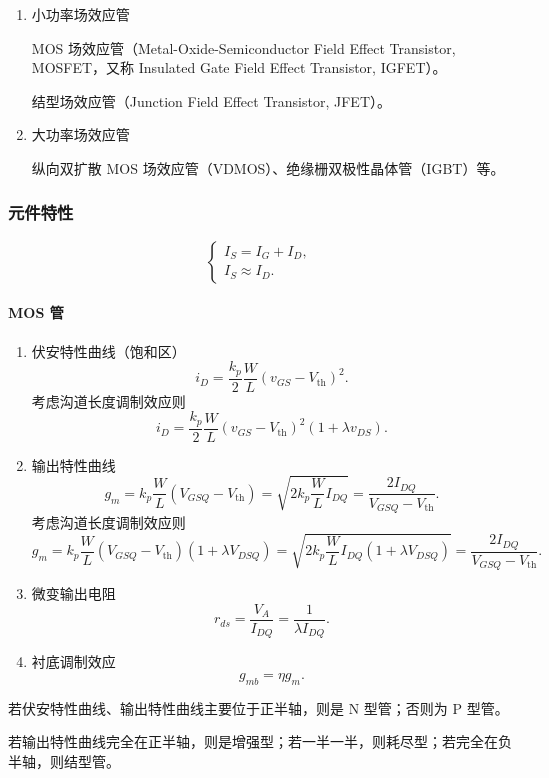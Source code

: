 \documentclass[UTF8,fontset=fandol,zihao=5]{ctexart}
\begin{document}
\begin{enumerate}
  \item 小功率场效应管

  MOS 场效应管（Metal-Oxide-Semiconductor Field Effect Transistor, MOSFET，又称 Insulated Gate Field Effect Transistor, IGFET）。

  结型场效应管（Junction Field Effect Transistor, JFET）。

  \item 大功率场效应管

  纵向双扩散 MOS 场效应管（VDMOS）、绝缘栅双极性晶体管（IGBT）等。
\end{enumerate}

\subsubsection{元件特性}

\[
  \begin{cases}
    I_S=I_G+I_D,\\
    I_S\approx I_D.
  \end{cases}
\]

\paragraph{MOS 管}

\begin{enumerate}
  \item 伏安特性曲线（饱和区）
  \[
    i_D=\frac{k_p}{2}\frac WL(v_{GS}-V_{\mathrm{th}})^2.
  \]
  考虑沟道长度调制效应则
  \[
    i_D=\frac{k_p}{2}\frac WL(v_{GS}-V_{\mathrm{th}})^2(1+\lambda v_{DS}).
  \]

  \item 输出特性曲线
  \[
    g_m=k_p\frac WL(V_{GSQ}-V_{\mathrm{th}})
    =\sqrt{2k_p\frac WL I_{DQ}}
    =\frac{2I_{DQ}}{V_{GSQ}-V_{\mathrm{th}}}.
  \]
  考虑沟道长度调制效应则
  \[
    g_m=k_p\frac WL(V_{GSQ}-V_{\mathrm{th}})(1+\lambda V_{DSQ})
    =\sqrt{2k_p\frac WL I_{DQ}(1+\lambda V_{DSQ})}
    =\frac{2I_{DQ}}{V_{GSQ}-V_{\mathrm{th}}}.
  \]

  \item 微变输出电阻
  \[
    r_{ds}=\frac{V_A}{I_{DQ}}=\frac{1}{\lambda I_{DQ}}.
  \]

  \item 衬底调制效应
  \[
    g_{mb}=\eta g_m.
  \]
\end{enumerate}

\begin{methodbox}[【技巧】根据特性曲线判断场效应管]
若伏安特性曲线、输出特性曲线主要位于正半轴，则是 N 型管；否则为 P 型管。

若输出特性曲线完全在正半轴，则是增强型；若一半一半，则耗尽型；若完全在负半轴，则结型管。
\end{methodbox}
\end{document}
